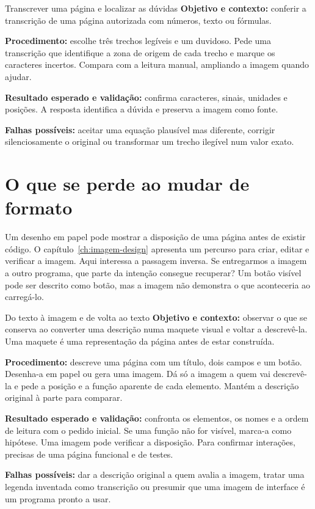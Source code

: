 \begin{promptlabbox}{Transcrever uma página e localizar as dúvidas}
\textbf{Objetivo e contexto:} conferir a transcrição de uma página autorizada com números, texto ou fórmulas.

\textbf{Procedimento:} escolhe três trechos legíveis e um duvidoso. Pede uma transcrição que identifique a zona de origem de cada trecho e marque os caracteres incertos. Compara com a leitura manual, ampliando a imagem quando ajudar.

\textbf{Resultado esperado e validação:} confirma caracteres, sinais, unidades e posições. A resposta identifica a dúvida e preserva a imagem como fonte.

\textbf{Falhas possíveis:} aceitar uma equação plausível mas diferente, corrigir silenciosamente o original ou transformar um trecho ilegível num valor exato.
\end{promptlabbox}

\section{O que se perde ao mudar de formato}

Um desenho em papel pode mostrar a disposição de uma página antes de existir código. O capítulo~\ref{ch:imagem-design} apresenta um percurso para criar, editar e verificar a imagem. Aqui interessa a passagem inversa. Se entregarmos a imagem a outro programa, que parte da intenção consegue recuperar? Um botão visível pode ser descrito como botão, mas a imagem não demonstra o que aconteceria ao carregá-lo.

\begin{promptlabbox}{Do texto à imagem e de volta ao texto}
\textbf{Objetivo e contexto:} observar o que se conserva ao converter uma descrição numa maquete visual e voltar a descrevê-la. Uma maquete é uma representação da página antes de estar construída.

\textbf{Procedimento:} descreve uma página com um título, dois campos e um botão. Desenha-a em papel ou gera uma imagem. Dá só a imagem a quem vai descrevê-la e pede a posição e a função aparente de cada elemento. Mantém a descrição original à parte para comparar.

\textbf{Resultado esperado e validação:} confronta os elementos, os nomes e a ordem de leitura com o pedido inicial. Se uma função não for visível, marca-a como hipótese. Uma imagem pode verificar a disposição. Para confirmar interações, precisas de uma página funcional e de testes.

\textbf{Falhas possíveis:} dar a descrição original a quem avalia a imagem, tratar uma legenda inventada como transcrição ou presumir que uma imagem de interface é um programa pronto a usar.
\end{promptlabbox}

